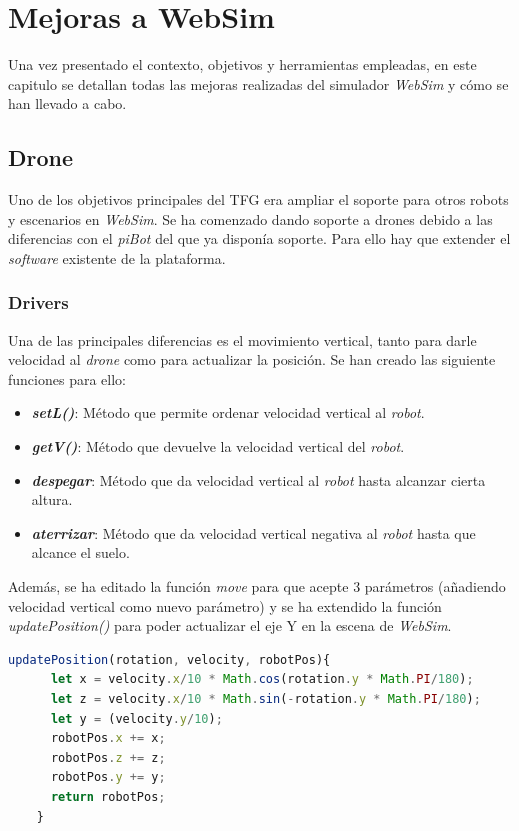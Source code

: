 \chapter{Mejoras a WebSim}
\label{chap:mejoras}
Una vez presentado el contexto, objetivos y herramientas empleadas, en este capitulo se detallan todas las mejoras realizadas del simulador \textit{WebSim} y cómo se han llevado a cabo. 

\section{Drone}
Uno de los objetivos principales del TFG era ampliar el soporte para otros robots y escenarios en \textit{WebSim}. Se ha comenzado dando soporte a drones debido a las diferencias con el \textit{piBot} del que ya disponía soporte. 
Para ello hay que extender el \textit{software} existente de la plataforma.
\subsection{Drivers}
Una de las principales diferencias es el movimiento vertical, tanto para darle velocidad al \textit{drone} como para actualizar la posición. 
Se han creado las siguiente funciones para ello:
\begin{itemize}
    \item \textit{\textbf{setL()}}: Método que permite ordenar velocidad vertical al \textit{robot}. 
    
    \item \textit{\textbf{getV()}}: Método que devuelve la velocidad vertical del \textit{robot}.
    
    \item \textit{\textit{\textbf{despegar}}}: Método que da velocidad vertical al \textit{robot} hasta alcanzar cierta altura.
    
    \item \textit{\textbf{aterrizar}}: Método que da velocidad vertical negativa al \textit{robot} hasta que alcance el suelo. 
\end{itemize}

Además, se ha editado la función \textit{move} para que acepte 3 parámetros (añadiendo velocidad vertical como nuevo parámetro) y se ha extendido la función \textit{updatePosition()} para poder actualizar el eje Y en la escena de \textit{WebSim}.

\begin{lstlisting}[language=javascript, caption=Función para actualizar la posición del robot en el escenario]
    updatePosition(rotation, velocity, robotPos){
      let x = velocity.x/10 * Math.cos(rotation.y * Math.PI/180);
      let z = velocity.x/10 * Math.sin(-rotation.y * Math.PI/180);
      let y = (velocity.y/10);
      robotPos.x += x;
      robotPos.z += z;
      robotPos.y += y;
      return robotPos;
    }
\end{lstlisting}

